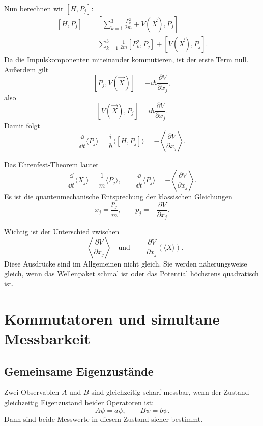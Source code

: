 \begin{derivationbox}
Nun berechnen wir $[H,P_j]$:
\[
\begin{aligned}
    [H,P_j]
    &=\left[\sum_{k=1}^3\frac{P_k^2}{2m}+V(\vec X),P_j\right] \\
    &=\sum_{k=1}^3\frac{1}{2m}[P_k^2,P_j]+[V(\vec X),P_j].
\end{aligned}
\]
Da die Impulskomponenten miteinander kommutieren, ist der erste Term null. Außerdem gilt
\[
    [P_j,V(\vec X)]=-i\hbar\frac{\partial V}{\partial x_j},
\]
also
\[
    [V(\vec X),P_j]=i\hbar\frac{\partial V}{\partial x_j}.
\]
Damit folgt
\[
    \frac{\dd}{\dd t}\langle P_j\rangle
    =\frac{i}{\hbar}\langle[H,P_j]\rangle
    =-\left\langle\frac{\partial V}{\partial x_j}\right\rangle.
\]
\end{derivationbox}

\begin{formulabox}
Das Ehrenfest-Theorem lautet
\[
    \frac{\dd}{\dd t}\langle X_j\rangle=\frac{1}{m}\langle P_j\rangle,
    \qquad
    \frac{\dd}{\dd t}\langle P_j\rangle=-\left\langle\frac{\partial V}{\partial x_j}\right\rangle.
\]
Es ist die quantenmechanische Entsprechung der klassischen Gleichungen
\[
    \dot x_j=\frac{p_j}{m},
    \qquad
    \dot p_j=-\frac{\partial V}{\partial x_j}.
\]
\end{formulabox}

\begin{notebox}
Wichtig ist der Unterschied zwischen
\[
    -\left\langle\frac{\partial V}{\partial x_j}\right\rangle
    \quad\text{und}\quad
    -\frac{\partial V}{\partial x_j}(\langle X\rangle).
\]
Diese Ausdrücke sind im Allgemeinen nicht gleich. Sie werden näherungsweise gleich, wenn das Wellenpaket schmal ist oder das Potential höchstens quadratisch ist.
\end{notebox}

\section{Kommutatoren und simultane Messbarkeit}

\subsection{Gemeinsame Eigenzustände}

Zwei Observablen $A$ und $B$ sind gleichzeitig scharf messbar, wenn der Zustand gleichzeitig Eigenzustand beider Operatoren ist:
\[
    A\psi=a\psi,
    \qquad
    B\psi=b\psi.
\]
Dann sind beide Messwerte in diesem Zustand sicher bestimmt.

